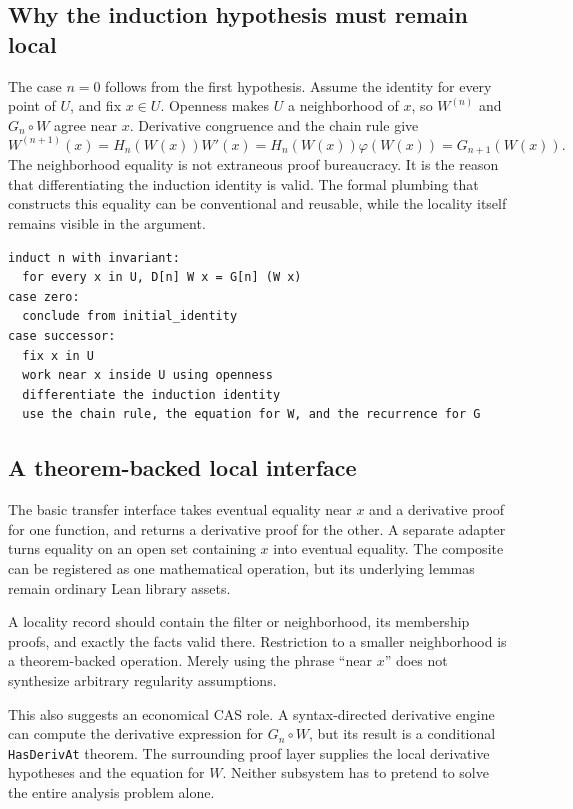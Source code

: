 \documentclass[11pt,a4paper]{article}
\newcommand{\code}[1]{\nolinkurl{#1}}
\theoremstyle{definition}
\begin{document}
\subsection{Why the induction hypothesis must remain local}
The case $n=0$ follows from the first hypothesis. Assume the identity for every
point of $U$, and fix $x\in U$. Openness makes $U$ a neighborhood of $x$, so
$W^{(n)}$ and $G_n\circ W$ agree near $x$. Derivative congruence and the chain
rule give
\[
 W^{(n+1)}(x)
 =H_n(W(x))W'(x)
 =H_n(W(x))\varphi(W(x))
 =G_{n+1}(W(x)).
\]
The neighborhood equality is not extraneous proof bureaucracy. It is the reason
that differentiating the induction identity is valid. The formal plumbing that
constructs this equality can be conventional and reusable, while the locality
itself remains visible in the argument.

\par\noindent\begin{minipage}{\linewidth}
\begin{lstlisting}
induct n with invariant:
  for every x in U, D[n] W x = G[n] (W x)
case zero:
  conclude from initial_identity
case successor:
  fix x in U
  work near x inside U using openness
  differentiate the induction identity
  use the chain rule, the equation for W, and the recurrence for G
\end{lstlisting}
\end{minipage}\par

\subsection{A theorem-backed local interface}
The basic transfer interface takes eventual equality near $x$ and a derivative
proof for one function, and returns a derivative proof for the other. A separate
adapter turns equality on an open set containing $x$ into eventual equality.
The composite can be registered as one mathematical operation, but its underlying
lemmas remain ordinary Lean library assets.

A locality record should contain the filter or neighborhood, its membership
proofs, and exactly the facts valid there. Restriction to a smaller neighborhood
is a theorem-backed operation. Merely using the phrase ``near $x$'' does not
synthesize arbitrary regularity assumptions.

This also suggests an economical CAS role. A syntax-directed derivative engine
can compute the derivative expression for $G_n\circ W$, but its result is a
conditional \code{HasDerivAt} theorem. The surrounding proof layer supplies the
local derivative hypotheses and the equation for $W$. Neither subsystem has to
pretend to solve the entire analysis problem alone.
\end{document}
